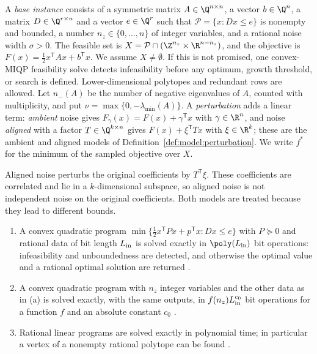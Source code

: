 \begin{definition}\label{def:qp:instance}
A \emph{base instance} consists of a symmetric matrix $A\in\Q^{n\times n}$,
a vector $b\in\Q^n$, a matrix $D\in\Q^{r\times n}$ and a vector $e\in\Q^r$
such that $\mathcal P=\{x:Dx\le e\}$ is nonempty and bounded, a number
$n_z\in\{0,\dots,n\}$ of integer variables, and a rational noise width
$\sigma>0$. The feasible set is
$X=\mathcal P\cap(\Z^{n_z}\times\R^{n-n_z})$, and the objective is
$F(x)=\frac12x^{\mathsf T} Ax+b^{\mathsf T} x$. We assume $X\ne\emptyset$.
If this is not promised, one convex-MIQP feasibility solve detects
infeasibility before any optimum, growth threshold, or search is defined.
Lower-dimensional polytopes and redundant
rows are allowed. Let $n_-(A)$ be the number of negative eigenvalues of $A$,
counted with multiplicity, and put $\nu=\max\{0,-\lambda_{\min}(A)\}$. A
\emph{perturbation} adds a linear term: \emph{ambient} noise gives
$F_\gamma(x)=F(x)+\gamma^{\mathsf T} x$ with $\gamma\in\R^n$, and noise
\emph{aligned} with a factor $T\in\Q^{k\times n}$ gives
$F(x)+\xi^{\mathsf T} Tx$ with $\xi\in\R^k$; these are the ambient and aligned
models of Definition~\ref{def:model:perturbation}. We write $f^*$ for the
minimum of the sampled objective over $X$.
\end{definition}

Aligned noise perturbs the original coefficients by $T^{\mathsf T}\xi$. These
coefficients are correlated and lie in a $k$-dimensional subspace, so aligned
noise is not independent noise on the original coefficients. Both models are
treated because they lead to different bounds.

\begin{proposition}\label{prop:qp:primitives}
\begin{enumerate}[label=(\alph*)]
\item A convex quadratic program $\min\{\frac12x^{\mathsf T} Px+p^{\mathsf T} x:Dx\le e\}$
 with $P\succeq0$ and rational data of bit length $L_{\rm in}$ is solved
 exactly in $\poly(L_{\rm in})$ bit operations: infeasibility and
 unboundedness are detected, and otherwise the optimal value and a rational
 optimal solution are returned
 \cite{kozlov1980-the-polynomial-solvability-of-convex}.
\item A convex quadratic program with $n_z$ integer variables and the other
 data as in (a) is solved exactly, with the same outputs, in
 $f(n_z)L_{\rm in}^{c_0}$ bit operations for a function $f$ and an absolute
 constant $c_0$ \cite[arXiv v2, Theorem~3]{pia2025-convex-quadratic-sets-and-the}.
\item Rational linear programs are solved exactly in polynomial time; in
 particular a vertex of a nonempty rational polytope can be found
 \cite{grotschel1988-geometric-algorithms-and-combinatorial-optimization}.
\end{enumerate}
\end{proposition}

